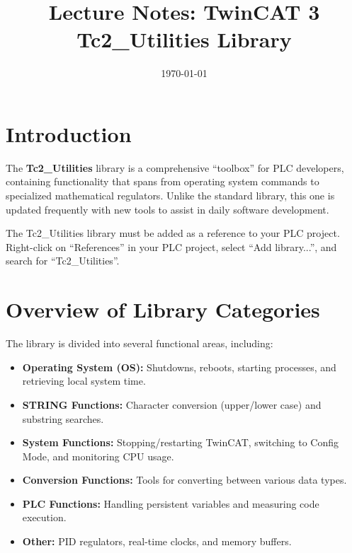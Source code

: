 \documentclass[11pt,a4paper]{article}
\title{
    \vspace{-1cm}
    \textbf{Lecture Notes: TwinCAT 3}\\
    \Large Tc2\_Utilities Library
}
\author{}
\date{\today}
\begin{document}
\maketitle

\tableofcontents
\newpage

\section*{Introduction}

The \textbf{Tc2\_Utilities} library is a comprehensive ``toolbox'' for PLC developers, containing functionality that spans from operating system commands to specialized mathematical regulators. Unlike the standard library, this one is updated frequently with new tools to assist in daily software development.

\begin{notebox}
The Tc2\_Utilities library must be added as a reference to your PLC project. Right-click on ``References'' in your PLC project, select ``Add library...'', and search for ``Tc2\_Utilities''.
\end{notebox}

\section{Overview of Library Categories}

The library is divided into several functional areas, including:

\begin{itemize}[leftmargin=*]
    \item \textbf{Operating System (OS):} Shutdowns, reboots, starting processes, and retrieving local system time.
    \item \textbf{STRING Functions:} Character conversion (upper/lower case) and substring searches.
    \item \textbf{System Functions:} Stopping/restarting TwinCAT, switching to Config Mode, and monitoring CPU usage.
    \item \textbf{Conversion Functions:} Tools for converting between various data types.
    \item \textbf{PLC Functions:} Handling persistent variables and measuring code execution.
    \item \textbf{Other:} PID regulators, real-time clocks, and memory buffers.
\end{itemize}
\end{document}
